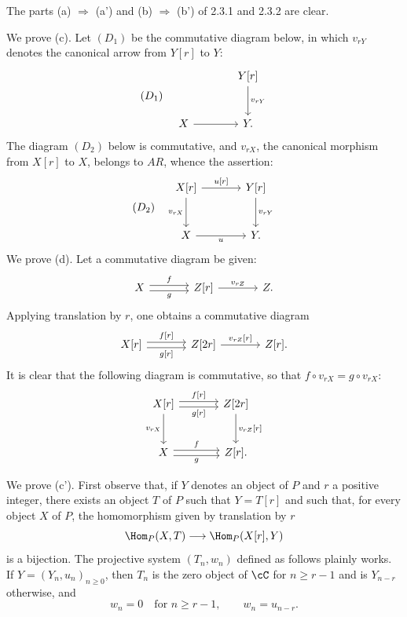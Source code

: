 \begin{prooftext}[Proof]
The parts (a) $\Rightarrow$ (a') and (b) $\Rightarrow$ (b') of 2.3.1 and 2.3.2 are clear.

We prove (c). Let $(D_1)$ be the commutative diagram below, in which $v_{rY}$ denotes the canonical arrow from $Y[r]$ to $Y$:
\[
(D_1)\quad
\begin{tikzcd}[column sep=large,row sep=large]
& Y[r] \arrow[d,"{v_{rY}}"]\\
X \arrow[r] & Y .
\end{tikzcd}
\]
The diagram $(D_2)$ below is commutative, and $v_{rX}$, the canonical morphism from $X[r]$ to $X$, belongs to $AR$, whence the assertion:
\[
(D_2)\quad
\begin{tikzcd}[column sep=large,row sep=large]
X[r] \arrow[r,"{u[r]}"] \arrow[d,"{v_{rX}}"'] & Y[r] \arrow[d,"{v_{rY}}"]\\
X \arrow[r,"u"'] & Y .
\end{tikzcd}
\]
We prove (d). Let a commutative diagram be given:
\[
\begin{tikzcd}[column sep=large]
X \arrow[r,shift left,"f"] \arrow[r,shift right,"g"'] & Z[r] \arrow[r,"{v_{rZ}}"] & Z .
\end{tikzcd}
\]
Applying translation by $r$, one obtains a commutative diagram
\[
\begin{tikzcd}[column sep=large]
X[r] \arrow[r,shift left,"{f[r]}"] \arrow[r,shift right,"{g[r]}"'] & Z[2r] \arrow[r,"{v_{rZ}[r]}"] & Z[r].
\end{tikzcd}
\]
It is clear that the following diagram is commutative, so that $f\circ v_{rX}=g\circ v_{rX}$:
\[
\begin{tikzcd}[column sep=large,row sep=large]
X[r] \arrow[r,shift left,"{f[r]}"] \arrow[r,shift right,"{g[r]}"'] \arrow[d,"{v_{rX}}"'] & Z[2r] \arrow[d,"{v_{rZ}[r]}"]\\
X \arrow[r,shift left,"f"] \arrow[r,shift right,"g"'] & Z[r] .
\end{tikzcd}
\]

We prove (c'). First observe that, if $Y$ denotes an object of $P$ and $r$ a positive integer, there exists an object $T$ of $P$ such that $Y=T[r]$ and such that, for every object $X$ of $P$, the homomorphism given by translation by $r$
\[
\Hom_P(X,T)\longrightarrow\Hom_P(X[r],Y)
\]
is a bijection. The projective system $(T_n,w_n)$ defined as follows plainly works. If $Y=(Y_n,u_n)_{n\ge0}$, then $T_n$ is the zero object of $\cC$ for $n\ge r-1$ and is $Y_{n-r}$ otherwise, and
\[
w_n=0\quad\text{for }n\ge r-1,\qquad w_n=u_{n-r}.
\]


\end{prooftext}
